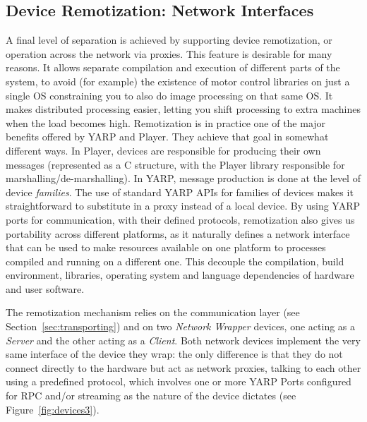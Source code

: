 \subsection{Device Remotization: Network Interfaces}
%
A final level of separation is achieved by supporting device remotization,
or operation across the network via proxies.
This feature is desirable for many reasons. It 
allows separate compilation and
execution of different parts of the system, to avoid (for example)
 the existence of motor control libraries on just a single OS
constraining you to also do image processing on that same OS.
It makes distributed processing easier, letting you shift
processing to extra machines when the load becomes high.
%
Remotization is in practice one of the major benefits offered by
YARP and Player.  They achieve that goal in somewhat different ways.
In Player, devices are responsible for producing their own messages
(represented as a C structure, with the Player library responsible for
marshalling/de-marshalling).
%
In YARP, message production is done at the level of device {\it families}.
%
The use of standard YARP APIs for families of devices
makes it straightforward to substitute in a proxy
instead of a local device.
%
%
By using YARP ports for communication, with their defined protocols,
remotization also gives us portability across different platforms, as 
it naturally defines a network interface that can 
be used to make resources available on one platform to processes compiled 
and running on a different one. This decouple the compilation, build 
environment, libraries, operating system and language dependencies of 
hardware and user software.

The remotization mechanism relies on the communication layer 
(see Section~\ref{sec:transporting}) and on two 
\emph{Network Wrapper} devices, 
one acting as a \emph{Server} and the other acting as a \emph{Client}. 
Both network devices implement the very same interface of the device 
they wrap: the only difference is that they 
do not connect directly to the hardware but act as network proxies, 
talking to each other using a predefined protocol, which involves one or more 
YARP Ports configured for RPC and/or streaming
as the nature of the device dictates (see Figure~\ref{fig:devices3}).

